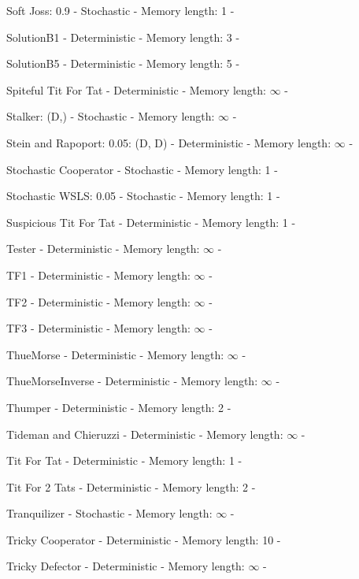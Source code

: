 \item Soft Joss: 0.9 - Stochastic - Memory length: 1 - \cite{Prison1998}
\item SolutionB1 - Deterministic - Memory length: 3 - \cite{Ashlock2015}
\item SolutionB5 - Deterministic - Memory length: 5 - \cite{Ashlock2015}
\item Spiteful Tit For Tat - Deterministic - Memory length: \(\infty\) - \cite{Prison1998}
\item Stalker: (D,) - Stochastic - Memory length: \(\infty\) - \cite{Andre2013}
\item Stein and Rapoport: 0.05: (D, D) - Deterministic - Memory length: \(\infty\) - \cite{Axelrod1980}
\item Stochastic Cooperator - Stochastic - Memory length: 1 - \cite{Adami2013}
\item Stochastic WSLS: 0.05 - Stochastic - Memory length: 1 - \cite{Amaral2016}
\item Suspicious Tit For Tat - Deterministic - Memory length: 1 - \cite{Hilbe2013, Beaufils1997}
\item Tester - Deterministic - Memory length: \(\infty\) - \cite{Axelrod1980b}
\item TF1 - Deterministic - Memory length: \(\infty\) - \cite{Knight2018}
\item TF2 - Deterministic - Memory length: \(\infty\) - \cite{Knight2018}
\item TF3 - Deterministic - Memory length: \(\infty\) - \cite{Knight2018}
\item ThueMorse - Deterministic - Memory length: \(\infty\) - \cite{Knight2018}
\item ThueMorseInverse - Deterministic - Memory length: \(\infty\) - \cite{Knight2018}
\item Thumper - Deterministic - Memory length: 2 - \cite{Ashlock2008}
\item Tideman and Chieruzzi - Deterministic - Memory length: \(\infty\) - \cite{Axelrod1980}
\item Tit For Tat - Deterministic - Memory length: 1 - \cite{Axelrod1980}
\item Tit For 2 Tats - Deterministic - Memory length: 2 - \cite{Axelrod1984}
\item Tranquilizer - Stochastic - Memory length: \(\infty\) - \cite{Axelrod1980}
\item Tricky Cooperator - Deterministic - Memory length: 10 - \cite{Knight2018}
\item Tricky Defector - Deterministic - Memory length: \(\infty\) - \cite{Knight2018}
